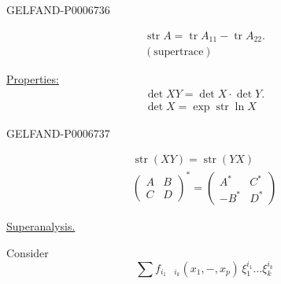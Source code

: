 \begin{GelfandAdjacentEvidence}{GELFAND-P000673}{6}

\[
\begin{gathered}
\operatorname{str}A=\operatorname{tr}A_{11}-\operatorname{tr}A_{22}.\\
(\text{supertrace})
\end{gathered}
\]

\underline{Properties:}
\[
\begin{gathered}
\det XY=\det X\cdot\det Y.\\
\det X=\exp\operatorname{str}\ln X
\end{gathered}
\]
\end{GelfandAdjacentEvidence}
\begin{GelfandAdjacentEvidence}{GELFAND-P000673}{7}

\[
\begin{gathered}
\operatorname{str}(XY)=\operatorname{str}(YX)\\
\begin{pmatrix}A&B\\ C&D\end{pmatrix}^{*}
=\begin{pmatrix}A^{*}&C^{*}\\ -B^{*}&D^{*}\end{pmatrix}
\end{gathered}
\]

\underline{Superanalysis.}

Consider
\[
\sum f_{i_1\quad i_k}(x_1,\mathord{-},x_p)\,
\xi_1^{i_1}\ldots\xi_k^{i_k}
\]
\end{GelfandAdjacentEvidence}
